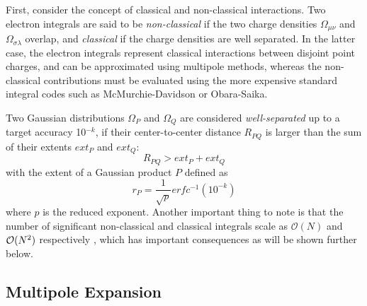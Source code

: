 First, consider the concept of classical and non-classical interactions. Two electron integrals are said to be \emph{non-classical} if the two charge densities $\Omega_{\mu\nu}$ and $\Omega_{\sigma\lambda}$ overlap, and \emph{classical} if the charge densities are well separated. In the latter case, the electron integrals represent classical interactions between disjoint point charges, and can be approximated using multipole methods, whereas the non-classical contributions must be evaluated using the more expensive standard integral codes such as McMurchie-Davidson or Obara-Saika. 

Two Gaussian distributions $\Omega_P$ and $\Omega_Q$ are considered \emph{well-separated} up to a target accuracy 10$^{-k}$, if their center-to-center distance $R_{PQ}$ is larger than the sum of their extents $ext_P$ and $ext_Q$:
\begin{equation}
R_{PQ} > ext_P + ext_Q
\end{equation} 
\noindent with the extent of a Gaussian product $P$ defined as 
\begin{equation}
r_P = \frac{1}{\sqrt{p}} erfc^{-1}(10^{-k})
\end{equation}
\noindent where $p$ is the reduced exponent. Another important thing to note is that the number of significant non-classical and classical integrals scale as $\mathcal{O}(N)$ and $\mathcal{O}(N^{2})$ respectively \cite{Hel2000}, which has important consequences as will be shown further below. 

\subsection{Multipole Expansion}

